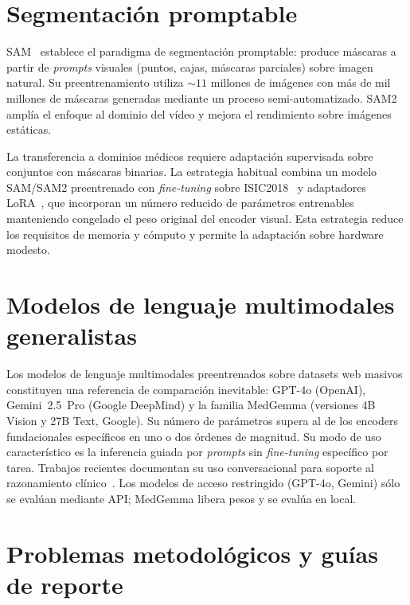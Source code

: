 \section{Segmentación promptable}
\label{sec:segmentacion}

SAM~\cite{sam2023} establece el paradigma de segmentación
promptable: produce máscaras a partir de \emph{prompts} visuales
(puntos, cajas, máscaras parciales) sobre imagen natural. Su
preentrenamiento utiliza $\sim 11$ millones de imágenes con
más de mil millones de máscaras generadas mediante un proceso
semi-automatizado. SAM2~\cite{sam2} amplía el enfoque al dominio
del vídeo y mejora el rendimiento sobre imágenes estáticas.

La transferencia a dominios médicos requiere adaptación supervisada
sobre conjuntos con máscaras binarias. La estrategia habitual
combina un modelo SAM/SAM2 preentrenado con \emph{fine-tuning} sobre
ISIC2018~\cite{isic2018} y adaptadores LoRA~\cite{lora}, que
incorporan un número reducido de parámetros entrenables manteniendo
congelado el peso original del encoder visual. Esta estrategia
reduce los requisitos de memoria y cómputo y permite la adaptación
sobre hardware modesto.

\section{Modelos de lenguaje multimodales generalistas}
\label{sec:llm-multimodal}

Los modelos de lenguaje multimodales preentrenados sobre datasets web
masivos constituyen una referencia de comparación inevitable: GPT-4o
(OpenAI), Gemini~2.5~Pro (Google DeepMind) y la familia MedGemma
(versiones 4B Vision y 27B Text, Google). Su número de parámetros
supera al de los encoders fundacionales específicos en uno o dos
órdenes de magnitud. Su modo de uso característico es la inferencia
guiada por \emph{prompts} sin \emph{fine-tuning} específico por
tarea. Trabajos recientes documentan su uso conversacional para
soporte al razonamiento clínico~\cite{amie2024,deepmind_aicoclinician}.
Los modelos de acceso restringido (GPT-4o, Gemini) sólo se evalúan
mediante API; MedGemma libera pesos y se evalúa en local.

\section{Problemas metodológicos y guías de reporte}
\label{sec:problemas-metodologicos}

